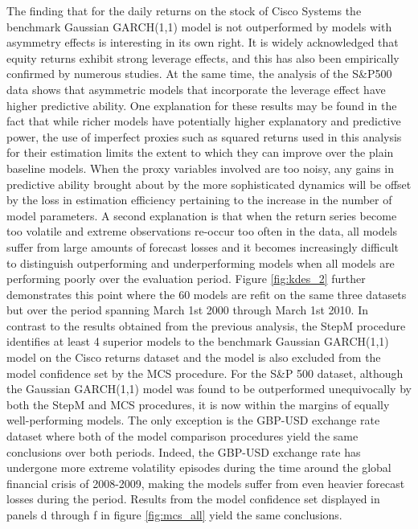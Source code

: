 \documentclass{article} %
\begin{document}
	The finding that for the daily returns on the stock of Cisco Systems the benchmark Gaussian GARCH(1,1) model is not outperformed by models with asymmetry effects is interesting in its own right. It is widely acknowledged that equity returns exhibit strong leverage effects, and this has also been empirically confirmed by numerous studies. At the same time, the analysis of the S\&P500 data shows that asymmetric models that incorporate the leverage effect have higher predictive ability. One explanation for these results may be found in the fact that while richer models have potentially higher explanatory and predictive power, the use of imperfect proxies such as squared returns used in this analysis for their estimation limits the extent to which they can improve over the plain baseline models. When the proxy variables involved are too noisy, any gains in predictive ability brought about by the more sophisticated dynamics will be offset by the loss in estimation efficiency pertaining to the increase in the number of model parameters. A second explanation is that when the return series become too volatile and extreme observations re-occur too often in the data, all models suffer from large amounts of forecast losses and it becomes increasingly difficult to distinguish outperforming and underperforming models when all models are performing poorly over the evaluation period. Figure \ref{fig:kdes_2} further demonstrates this point where the 60 models are refit on the same three datasets but over the period spanning March 1st 2000 through March 1st 2010. In contrast to the results obtained from the previous analysis, the StepM procedure identifies at least 4 superior models to the benchmark Gaussian GARCH(1,1) model on the Cisco returns dataset and the model is also excluded from the model confidence set by the MCS procedure. For the S\&P 500 dataset, although the Gaussian GARCH(1,1) model was found to be outperformed unequivocally by both the StepM and MCS procedures, it is now within the margins of equally well-performing models. The only exception is the GBP-USD exchange rate dataset where both of the model comparison procedures yield the same conclusions over both periods. Indeed, the GBP-USD exchange rate has undergone more extreme volatility episodes during the time around the global financial crisis of 2008-2009, making the models suffer from even heavier forecast losses during the period. Results from the model confidence set displayed in panels d through f in figure \ref{fig:mcs_all} yield the same conclusions.
	
\end{document}
